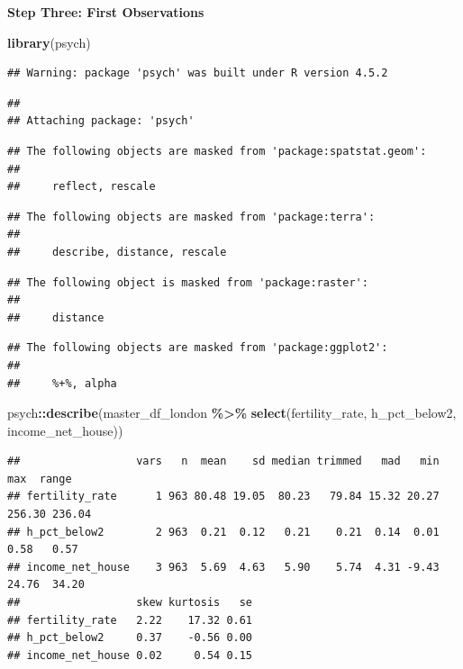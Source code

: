 \documentclass[
]{article}
\newenvironment{Shaded}{\begin{snugshade}}{\end{snugshade}}
\newcommand{\FunctionTok}[1]{\textcolor[rgb]{0.13,0.29,0.53}{\textbf{#1}}}
\newcommand{\NormalTok}[1]{#1}
\newcommand{\SpecialCharTok}[1]{\textcolor[rgb]{0.81,0.36,0.00}{\textbf{#1}}}
\begin{document}
\textbf{Step Three: First Observations}

\begin{Shaded}
\begin{Highlighting}[]
\FunctionTok{library}\NormalTok{(psych)}
\end{Highlighting}
\end{Shaded}

\begin{verbatim}
## Warning: package 'psych' was built under R version 4.5.2
\end{verbatim}

\begin{verbatim}
## 
## Attaching package: 'psych'
\end{verbatim}

\begin{verbatim}
## The following objects are masked from 'package:spatstat.geom':
## 
##     reflect, rescale
\end{verbatim}

\begin{verbatim}
## The following objects are masked from 'package:terra':
## 
##     describe, distance, rescale
\end{verbatim}

\begin{verbatim}
## The following object is masked from 'package:raster':
## 
##     distance
\end{verbatim}

\begin{verbatim}
## The following objects are masked from 'package:ggplot2':
## 
##     %+%, alpha
\end{verbatim}

\begin{Shaded}
\begin{Highlighting}[]
\NormalTok{psych}\SpecialCharTok{::}\FunctionTok{describe}\NormalTok{(master\_df\_london }\SpecialCharTok{\%\textgreater{}\%} \FunctionTok{select}\NormalTok{(fertility\_rate, h\_pct\_below2, income\_net\_house))}
\end{Highlighting}
\end{Shaded}

\begin{verbatim}
##                  vars   n  mean    sd median trimmed   mad   min    max  range
## fertility_rate      1 963 80.48 19.05  80.23   79.84 15.32 20.27 256.30 236.04
## h_pct_below2        2 963  0.21  0.12   0.21    0.21  0.14  0.01   0.58   0.57
## income_net_house    3 963  5.69  4.63   5.90    5.74  4.31 -9.43  24.76  34.20
##                  skew kurtosis   se
## fertility_rate   2.22    17.32 0.61
## h_pct_below2     0.37    -0.56 0.00
## income_net_house 0.02     0.54 0.15
\end{verbatim}
\end{document}
